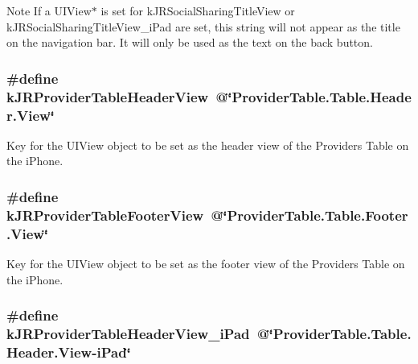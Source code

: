 \begin{DoxyNote}{Note}
If a UIView$\ast$ is set for kJRSocialSharingTitleView or kJRSocialSharingTitleView\_\-iPad are set, this string will not appear as the title on the navigation bar. It will only be used as the text on the back button. 
\end{DoxyNote}
\hypertarget{group__custom_interface_ga1a0f39bfdb880fdd0b8b39cbec492b6f}{
\subsubsection[{kJRProviderTableHeaderView}]{\setlength{\rightskip}{0pt plus 5cm}\#define kJRProviderTableHeaderView~@\char`\"{}ProviderTable.Table.Header.View\char`\"{}}}
\label{group__custom_interface_ga1a0f39bfdb880fdd0b8b39cbec492b6f}
Key for the {\ttfamily UIView} object to be set as the header view of the Providers Table on the iPhone. \hypertarget{group__custom_interface_ga2b5c9162dd7701a552147ae1607a3b4d}{
\subsubsection[{kJRProviderTableFooterView}]{\setlength{\rightskip}{0pt plus 5cm}\#define kJRProviderTableFooterView~@\char`\"{}ProviderTable.Table.Footer.View\char`\"{}}}
\label{group__custom_interface_ga2b5c9162dd7701a552147ae1607a3b4d}
Key for the {\ttfamily UIView} object to be set as the footer view of the Providers Table on the iPhone. \hypertarget{group__custom_interface_gafaf90a1aa537b105ebc2409ceacc652f}{
\subsubsection[{kJRProviderTableHeaderView\_\-iPad}]{\setlength{\rightskip}{0pt plus 5cm}\#define kJRProviderTableHeaderView\_\-iPad~@\char`\"{}ProviderTable.Table.Header.View-\/iPad\char`\"{}}}
\label{group__custom_interface_gafaf90a1aa537b105ebc2409ceacc652f}
